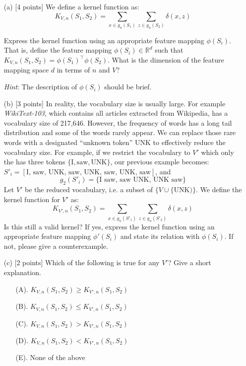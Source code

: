 \documentclass{article}
\newif\ifsolutions
\newenvironment{labelledanswer}{{\bf Answer:} \sf }{}%
\newcommand{\answer}[2]
{{
\ifsolutions
\begin{labelledanswer}
\color{red} 
#2
\end{labelledanswer}
\else
#1
\fi
}}
\begin{document}
\begin{itemize}
    \item [(a)] [4 points] 
    We define a kernel function as:
    $$
    K_{V,n}(S_1, S_2) = \sum_{x\in g_n(S_1)} \sum_{z\in g_n(S_2)} \delta(x, z)
    $$
    
    Express the kernel function using an appropriate feature mapping $\phi(S_i)$.
    That is, define the feature mapping $\phi(S_i) \in \mathbb{R}^d$ such that $K_{V,n}(S_1, S_2) = \phi(S_1)^\top\phi(S_2)$.
    What is the dimension of the feature mapping space $d$ in terms of $n$ and $V$?
    
    \emph{Hint}: The description of $\phi(S_i)$ should be brief.
    
    \answer{}{}
    
    \item[(b)] [3 points] In reality, the vocabulary size is usually large. For example {\it WikiText-103}, which contains all articles extracted from Wikipedia, has a vocabulary size of 217,646. However, the frequency of words has a long tail distribution and some of the words rarely appear. We can replace those rare words with a designated ``unknown token'' UNK to effectively reduce the vocabulary size. For example, if we restrict the vocabulary to $V'$ which only the has three tokens $\{ \text{I}, \text{saw}, \text{UNK}\}$, our previous example becomes: $S'_i = [\text{I, saw, UNK, saw, UNK, saw, UNK, saw}]$, and
    $$
        g_2(S'_i) = \{\text{I saw},\, \text{saw UNK}, \, \text{UNK saw}\}
    $$
    Let $V'$ be the reduced vocabulary, i.e. a subset of $\{V \cup \{\text{UNK})\}$.
    We define the kernel function for $V'$ as:
        $$
        K_{V', n}(S_1, S_2) = \sum_{x\in g_n(S'_1)} \sum_{z\in g_n(S'_2)} \delta(x, z)
    $$
    Is this still a valid kernel? If yes, express the kernel function using an appropriate feature mapping $\phi'(S_i)$ and state its relation with $\phi(S_i)$. If not, please give a counterexample.
    
    \answer{}{}
    
    \clearpage  
    
    \item[(c)] [2 points] Which of the following is true for any $V'$? Give a short explanation. 
    \begin{enumerate}
        \item [(A).] $K_{V, n}(S_1, S_2) \geq K_{V', n}(S_1, S_2)$
        \item [(B).] $K_{V, n}(S_1, S_2) \leq K_{V', n}(S_1, S_2)$
        \item [(C).] $K_{V, n}(S_1, S_2) > K_{V', n}(S_1, S_2)$
        \item [(D).] $K_{V, n}(S_1, S_2) < K_{V', n}(S_1, S_2)$
        \item [(E).] None of the above
    \end{enumerate}
    

\end{itemize}
\end{document}
